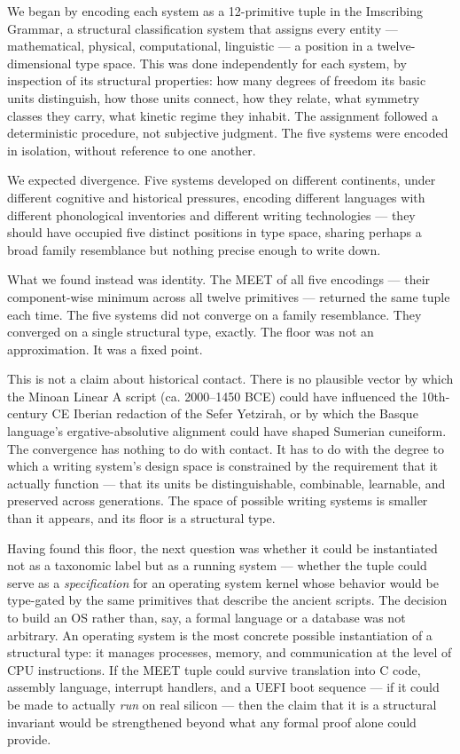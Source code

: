 \documentclass[12pt,a4paper]{article}
\begin{document}
We began by encoding each system as a 12-primitive tuple in the Imscribing Grammar, a structural classification system that assigns every entity --- mathematical, physical, computational, linguistic --- a position in a twelve-dimensional type space. This was done independently for each system, by inspection of its structural properties: how many degrees of freedom its basic units distinguish, how those units connect, how they relate, what symmetry classes they carry, what kinetic regime they inhabit. The assignment followed a deterministic procedure, not subjective judgment. The five systems were encoded in isolation, without reference to one another.

We expected divergence. Five systems developed on different continents, under different cognitive and historical pressures, encoding different languages with different phonological inventories and different writing technologies --- they should have occupied five distinct positions in type space, sharing perhaps a broad family resemblance but nothing precise enough to write down.

What we found instead was identity. The MEET of all five encodings --- their component-wise minimum across all twelve primitives --- returned the same tuple each time. The five systems did not converge on a family resemblance. They converged on a single structural type, exactly. The floor was not an approximation. It was a fixed point.

This is not a claim about historical contact. There is no plausible vector by which the Minoan Linear A script (ca. 2000--1450 BCE) could have influenced the 10th-century CE Iberian redaction of the Sefer Yetzirah, or by which the Basque language's ergative-absolutive alignment could have shaped Sumerian cuneiform. The convergence has nothing to do with contact. It has to do with the degree to which a writing system's design space is constrained by the requirement that it actually function --- that its units be distinguishable, combinable, learnable, and preserved across generations. The space of possible writing systems is smaller than it appears, and its floor is a structural type.

Having found this floor, the next question was whether it could be instantiated not as a taxonomic label but as a running system --- whether the tuple could serve as a \emph{specification} for an operating system kernel whose behavior would be type-gated by the same primitives that describe the ancient scripts. The decision to build an OS rather than, say, a formal language or a database was not arbitrary. An operating system is the most concrete possible instantiation of a structural type: it manages processes, memory, and communication at the level of CPU instructions. If the MEET tuple could survive translation into C code, assembly language, interrupt handlers, and a UEFI boot sequence --- if it could be made to actually \emph{run} on real silicon --- then the claim that it is a structural invariant would be strengthened beyond what any formal proof alone could provide.
\end{document}
